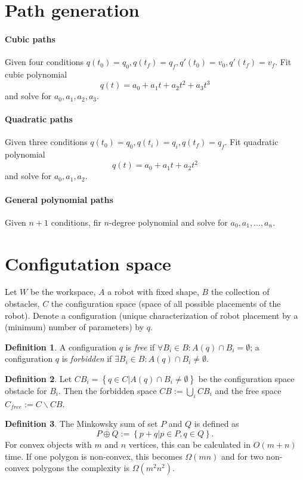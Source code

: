 \documentclass{article}
\theoremstyle{definition}
\newtheorem{definition}{Definition}[section]
\begin{document}
\section{Path generation}
\paragraph{Cubic paths}
Given four conditions $q(t_0) = q_0, q(t_f) = q_f, q'(t_0) = v_0, q'(t_f) = v_f$. Fit cubic polynomial \[ q(t) = a_0 + a_1t + a_2t^2 + a_3t^3 \] and solve for $a_0, a_1, a_2, a_3$.

\paragraph{Quadratic paths}
Given three conditions $q(t_0) = q_0, q(t_i) = q_i, q(t_f) = q_f$. Fit quadratic polynomial \[ q(t) = a_0 + a_1t + a_2t^2 \] and solve for $a_0, a_1, a_2$.

\paragraph{General polynomial paths}
Given $n+1$ conditions, fir $n$-degree polynomial and solve for $a_0, a_1, ..., a_n$.

\section{Configutation space}
Let $W$ be the workspace, $A$ a robot with fixed shape, $B$ the collection of obstacles, $C$ the configuration space (space of all possible placements of the robot). Denote a configuration (unique characterization of robot placement by a (minimum) number of parameters) by $q$.

\begin{definition}
A configuration $q$ is \emph{free} if $\forall B_i \in B : A(q) \cap B_i = \emptyset$; a configuration $q$ is \emph{forbidden} if $\exists B_i \in B : A(q) \cap B_i \neq \emptyset$.
\end{definition}

\begin{definition}
Let $CB_i = \left\{ q \in C | A(q) \cap B_i \neq \emptyset \right\}$ be the configuration space obstacle for $B_i$. Then the forbidden space $CB := \bigcup \limits_i CB_i$ and the free space $C_{free} := C \backslash CB$.
\end{definition}

\begin{definition}
The Minkowsky sum of set $P$ and $Q$ is defined as \[ P \oplus Q := \left\{ p + q | p \in P, q \in Q \right\}. \] For convex objects with $m$ and $n$ vertices, this can be calculated in $O(m + n)$ time. If one polygon is non-convex, this becomes $\Omega(mn)$ and for two non-convex polygons the complexity is $\Omega(m^2n^2)$.
\end{definition}
\end{document}
